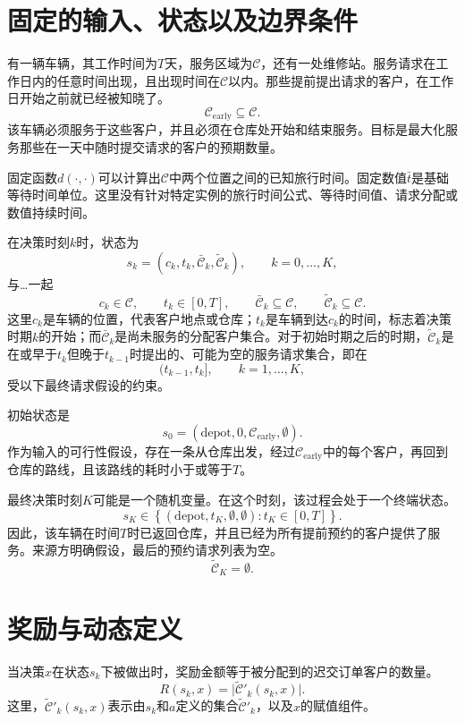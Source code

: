 \documentclass{article}
\begin{document}
\section*{固定的输入、状态以及边界条件}

有一辆车辆，其工作时间为$T$天，服务区域为$\mathcal{C}$，还有一处维修站。服务请求在工作日内的任意时间出现，且出现时间在$\mathcal{C}$以内。那些提前提出请求的客户，在工作日开始之前就已经被知晓了。
\[
\mathcal{C}_{\mathrm{early}}\subseteq\mathcal{C}.
\]
该车辆必须服务于这些客户，并且必须在仓库处开始和结束服务。目标是最大化服务那些在一天中随时提交请求的客户的预期数量。

固定函数$d(\cdot,\cdot)$可以计算出$\mathcal{C}$中两个位置之间的已知旅行时间。固定数值$\bar t$是基础等待时间单位。这里没有针对特定实例的旅行时间公式、等待时间值、请求分配或数值持续时间。

在决策时刻$k$时，状态为
\[
s_k=(c_k,t_k,\bar{\mathcal{C}}_k,\tilde{\mathcal{C}}_k),
\qquad k=0,\ldots,K,
\]
与…一起
\[
c_k\in\mathcal{C},\qquad
 t_k\in[0,T],\qquad
 \bar{\mathcal{C}}_k\subseteq\mathcal{C},\qquad
 \tilde{\mathcal{C}}_k\subseteq\mathcal{C}.
\]
这里$c_k$是车辆的位置，代表客户地点或仓库；$t_k$是车辆到达$c_k$的时间，标志着决策时期$k$的开始；而$\bar{\mathcal{C}}_k$是尚未服务的分配客户集合。对于初始时期之后的时期，$\tilde{\mathcal{C}}_k$是在或早于$t_k$但晚于$t_{k-1}$时提出的、可能为空的服务请求集合，即在
\[
(t_{k-1},t_k],\qquad k=1,\ldots,K,
\]
受以下最终请求假设的约束。

初始状态是
\[
s_0=(\text{depot},0,\mathcal{C}_{\mathrm{early}},\emptyset).
\]
作为输入的可行性假设，存在一条从仓库出发，经过$\mathcal{C}_{\mathrm{early}}$中的每个客户，再回到仓库的路线，且该路线的耗时小于或等于$T$。

最终决策时刻$K$可能是一个随机变量。在这个时刻，该过程会处于一个终端状态。
\[
s_K\in
\left\{(\text{depot},t_K,\emptyset,\emptyset):t_K\in[0,T]\right\}.
\]
因此，该车辆在时间$T$时已返回仓库，并且已经为所有提前预约的客户提供了服务。来源方明确假设，最后的预约请求列表为空。
\[
\tilde{\mathcal{C}}_K=\emptyset.
\]

\section*{奖励与动态定义}

当决策$x$在状态$s_k$下被做出时，奖励金额等于被分配到的迟交订单客户的数量。
\[
R(s_k,x)=\bigl|\tilde{\mathcal{C}}'_k(s_k,x)\bigr|.
\]
这里，$\tilde{\mathcal{C}}'_k(s_k,x)$表示由$s_k$和$a$定义的集合$\tilde{\mathcal{C}}'_k$，以及$x$的赋值组件。
\end{document}
